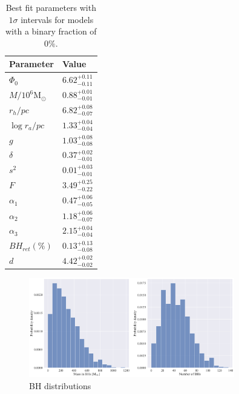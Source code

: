 \begin{table}
	\centering
	\caption{Best fit parameters with $1\sigma$ intervals for models with a binary fraction of $0\%$.}
	\begin{tabular}{l l}

		\hline
		Parameter                 & Value                  \\
		\hline
		$\Phi_0$                  & $6.62^{+0.11}_{-0.11}$ \\
		$M/10^6 \mathrm{M}_\odot$ & $0.88^{+0.01}_{-0.01}$ \\
		$r_h / pc$                & $6.82^{+0.08}_{-0.07}$ \\
		$\log{r_a / pc}$          & $1.33^{+0.04}_{-0.04}$ \\
		$g$                       & $1.03^{+0.08}_{-0.08}$ \\
		$\delta$                  & $0.37^{+0.02}_{-0.01}$ \\
		$s^2$                     & $0.01^{+0.03}_{-0.01}$ \\
		$F$                       & $3.49^{+0.25}_{-0.22}$ \\
		$\alpha_1$                & $0.47^{+0.06}_{-0.05}$ \\
		$\alpha_2$                & $1.18^{+0.06}_{-0.07}$ \\
		$\alpha_3$                & $2.15^{+0.04}_{-0.04}$ \\
		$BH_{ret} (\%)$           & $0.13^{+0.13}_{-0.08}$ \\
		$d$                       & $4.42^{+0.02}_{-0.02}$ \\
		\hline
	\end{tabular}
	\label{tab:parameters_nobin}
\end{table}

\begin{figure}
	\centering
	\includegraphics[width=0.8\textwidth]{figures/prev_nobin/BH_dists.png}
	\caption{BH distributions}
	\label{fig:prev_nobin_BH_dists}
\end{figure}


